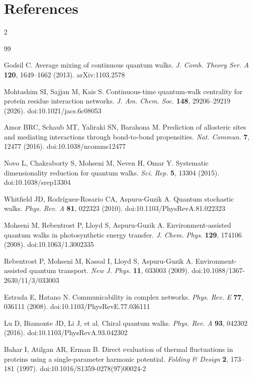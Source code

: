 \documentclass[10pt,a4paper]{article}
\begin{document}
\section{References}
\small
\setlength{\columnsep}{16pt}
\begin{multicols}{2}
\begin{thebibliography}{99}
\setlength{\itemsep}{2pt}\setlength{\parskip}{0pt}\selectfont

 Godsil C. Average mixing of continuous quantum walks.
  \textit{J. Comb. Theory Ser. A} \textbf{120}, 1649--1662 (2013). arXiv:1103.2578

 Mohtashim SI, Sajjan M, Kais S. Continuous-time quantum-walk centrality for
  protein residue interaction networks. \textit{J. Am. Chem. Soc.} \textbf{148}, 29206--29219 (2026).
  doi:10.1021/jacs.6c08053

 Amor BRC, Schaub MT, Yaliraki SN, Barahona M. Prediction of allosteric sites and
  mediating interactions through bond-to-bond propensities. \textit{Nat. Commun.} \textbf{7}, 12477
  (2016). doi:10.1038/ncomms12477

 Novo L, Chakraborty S, Mohseni M, Neven H, Omar Y. Systematic dimensionality
  reduction for quantum walks. \textit{Sci. Rep.} \textbf{5}, 13304 (2015). doi:10.1038/srep13304

 Whitfield JD, Rodr\'iguez-Rosario CA, Aspuru-Guzik A. Quantum stochastic
  walks. \textit{Phys. Rev. A} \textbf{81}, 022323 (2010). doi:10.1103/PhysRevA.81.022323

 Mohseni M, Rebentrost P, Lloyd S, Aspuru-Guzik A. Environment-assisted quantum
  walks in photosynthetic energy transfer. \textit{J. Chem. Phys.} \textbf{129}, 174106 (2008).
  doi:10.1063/1.3002335

 Rebentrost P, Mohseni M, Kassal I, Lloyd S, Aspuru-Guzik A.
  Environment-assisted quantum transport. \textit{New J. Phys.} \textbf{11}, 033003 (2009).
  doi:10.1088/1367-2630/11/3/033003

 Estrada E, Hatano N. Communicability in complex networks.
  \textit{Phys. Rev. E} \textbf{77}, 036111 (2008). doi:10.1103/PhysRevE.77.036111

 Lu D, Biamonte JD, Li J, et al. Chiral quantum walks. \textit{Phys. Rev. A}
  \textbf{93}, 042302 (2016). doi:10.1103/PhysRevA.93.042302

 Bahar I, Atilgan AR, Erman B. Direct evaluation of thermal fluctuations in
  proteins using a single-parameter harmonic potential. \textit{Folding \& Design} \textbf{2},
  173--181 (1997). doi:10.1016/S1359-0278(97)00024-2


\end{thebibliography}
\end{multicols}
\end{document}
